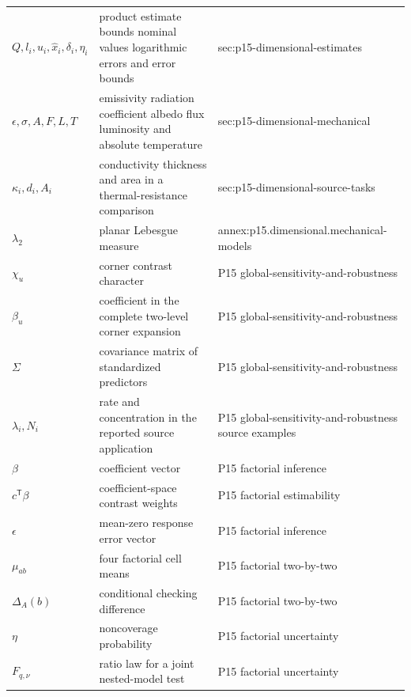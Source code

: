 \begin{longtable}{@{}p{}p{}p{}@{}}
\(Q,\allowbreak l_i,\allowbreak u_i,\allowbreak \widehat x_i,\allowbreak \delta_i,\allowbreak \eta_i\) & product estimate bounds nominal values logarithmic errors and error bounds & sec:\allowbreak{}p15-\allowbreak{}dimensional-\allowbreak{}estimates \\
\(\epsilon,\allowbreak \sigma,\allowbreak A,\allowbreak F,\allowbreak L,\allowbreak T\) & emissivity radiation coefficient albedo flux luminosity and absolute temperature & sec:\allowbreak{}p15-\allowbreak{}dimensional-\allowbreak{}mechanical \\
\(\kappa_i,\allowbreak d_i,\allowbreak A_i\) & conductivity thickness and area in a thermal-resistance comparison & sec:\allowbreak{}p15-\allowbreak{}dimensional-\allowbreak{}source-\allowbreak{}tasks \\
\(\lambda_2\) & planar Lebesgue measure & annex:\allowbreak{}p15.\allowbreak{}dimensional.\allowbreak{}mechanical-\allowbreak{}models \\
\(\chi_u\) & corner contrast character & P15 global-\allowbreak{}sensitivity-\allowbreak{}and-\allowbreak{}robustness \\
\(\beta_u\) & coefficient in the complete two-level corner expansion & P15 global-\allowbreak{}sensitivity-\allowbreak{}and-\allowbreak{}robustness \\
\(\Sigma\) & covariance matrix of standardized predictors & P15 global-\allowbreak{}sensitivity-\allowbreak{}and-\allowbreak{}robustness \\
\(\lambda_i,\allowbreak N_i\) & rate and concentration in the reported source application & P15 global-\allowbreak{}sensitivity-\allowbreak{}and-\allowbreak{}robustness source examples \\
\(\beta\) & coefficient vector & P15 factorial inference \\
\(c^{\mathsf T}\beta\) & coefficient-space contrast weights & P15 factorial estimability \\
\(\epsilon\) & mean-zero response error vector & P15 factorial inference \\
\(\mu_{ab}\) & four factorial cell means & P15 factorial two-\allowbreak{}by-\allowbreak{}two \\
\(\Delta_A(b)\) & conditional checking difference & P15 factorial two-\allowbreak{}by-\allowbreak{}two \\
\(\eta\) & noncoverage probability & P15 factorial uncertainty \\
\(F_{q,\nu}\) & ratio law for a joint nested-model test & P15 factorial uncertainty \\

\end{longtable}
